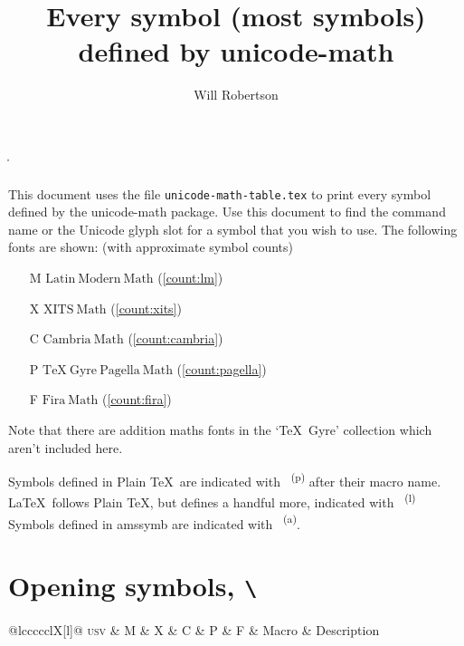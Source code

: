 \documentclass[final]{article}
\makeatletter
\def\cmd#1{\texttt{\textbackslash\expandafter\@gobble\string#1}}
\newcounter{#1}
\def\INPUT{}
\def\TABLE{%
  \par\noindent
  \begin{longtabu}[l]{@{}lccccclX[l]@{}}
    \toprule
    \textsc{usv} & M & X & C & P & F & Macro & Description \\
    \midrule \endhead
    \INPUT\\
    \bottomrule
  \end{longtabu}
}
\def\USV#1{\footnotesize\scshape\MakeLowercase{u+\@gobble#1}}
\def\CMD#1{\footnotesize\cmd#1}
\def\DESC#1{%
  \begin{spacing}{0.5}
    \RaggedRight\scriptsize #1%
  \end{spacing}
}
\newcommand\SHOW[1]{%
  \def\UnicodeMathSymbol##1##2##3##4{%
    \def\1{#1}\def\2{##3}%
    \ifx\1\2\PRINTLINE{##1}{##2}{##4}\fi
  }%
  \TABLE
}
\def\PRINTLINE#1#2#3{
    \def\tempa{
      \USV{#1} &
      \SYMB{#2}{lm}{#1} &
      \SYMB{#2}{xits}{#1} &
      \SYMB{#2}{cambria}{#1} &
      \SYMB{#2}{pagella}{#1} &
      \SYMB{#2}{fira}{#1} &
      \CMD{#2}
      \tl_if_in:NnT \PLAIN {#2}
        {
          \makebox[0pt][l]
            { \color[gray]{0.7} \textsuperscript{\sffamily (p)} }
        }
      \tl_if_in:NnT \LTXSYM {#2}
        {
          \makebox[0pt][l]
            { \color[gray]{0.7} \textsuperscript{\sffamily (l)} }
        }
      \tl_if_in:NnT \AMSSYMB {#2}
        {
          \makebox[0pt][l]
            { \color[gray]{0.7} \textsuperscript{\sffamily (a)} }
        }
      &
      \DESC{#3} \\
    }%
    \expandafter\tempa
}
\def\SYMB#1#2#3{%
  \expandafter\iffontchar\csname#2\endcsname #3\relax
    \refstepcounter{#2}%
    \mathversion{#2}%
    $\displaystyle#1$%
  \fi
}
\def\PLAIN{\alpha\beta\gamma\delta\epsilon\zeta\eta\theta\iota\kappa\lambda\mu\nu\xi\pi\rho\sigma\tau\upsilon\phi\chi\psi\omega\varepsilon\vartheta\varpi\varrho\varsigma\varphi\Gamma\Delta\Theta\Lambda\Xi\Pi\Sigma\Upsilon\Phi\Psi\Omega
%
\aleph\hbar\imath\jmath\ell\wp\Re\Im\partial\infty\prime\emptyset\nabla\surd\top\bot\angle\triangle\forall\exists\neg\flat\natural\sharp\clubsuit\diamondsuit\heartsuit\spadesuit
%
\coprod\bigvee\bigwedge\biguplus\bigcap\bigcup\int\prod\sum\bigotimes\bigoplus\bigodot\oint\bigsqcup\smallint
%
\triangleleft\triangleright\bigtriangleup\bigtriangledown\wedge\land\vee\lor\cap\cup\ddagger\dagger\sqcap\sqcup\uplus\amalg\diamond\bullet\wr\div\odot\oslash\otimes\ominus\oplus\mp\pm\circ\bigcirc\setminus\cdot\ast\times\star\propto\sqsubseteq\sqsupseteq\parallel\mid\dashv\vdash\nearrow\searrow\nwarrow\swarrow\Leftrightarrow\Leftarrow\Rightarrow\neq\ne\lnot\leq\le\geq\ge\succ\prec\approx\succeq\preceq\supset\subset\supseteq\subseteq\in\ni\owns\gg\ll\not\leftrightarrow\leftarrow\gets\rightarrow\to\mapstochar\mapsto\sim\simeq\perp\equiv\asymp\smile\frown\leftharpoonup\leftharpoondown\rightharpoonup\rightharpoondown
%
\joinrel\relbar\Relbar\lhook\hookrightarrow\rhook\hookleftarrow\bowtie\models\Longrightarrow\longrightarrow\longleftarrow\Longleftarrow\longmapsto\longleftrightarrow\Longleftrightarrow\iff
%
\ldotp\cdotp\colon\ldots\cdots\vdots\ddots
%
\acute\grave\ddot\tilde\bar\breve\check\hat\vec\dot\widetilde\widehat
%
\overrightarrow\overleftarrow\overbrace\underbrace\lmoustache\rmoustache\lgroup\rgroup\arrowvert\Arrowvert\bracevert\Vert\vert\uparrow\downarrow\updownarrow\Uparrow\Downarrow\Updownarrow\backslash\rangle\langle\rbrace\lbrace\rceil\lceil\rfloor\lfloor\sqrt}
\def\LTXSYM{
\cong
\notin
\rightleftharpoons
\doteq
\mathring
}
\def\AMSSYMB{\boxdot\boxplus\boxtimes\square\blacksquare\centerdot\lozenge\blacklozenge\circlearrowright\circlearrowleft\leftrightharpoons\boxminus\Vdash\Vvdash\vDash\twoheadrightarrow\twoheadleftarrow\leftleftarrows\rightrightarrows\upuparrows\downdownarrows\upharpoonright\restriction\downharpoonright\upharpoonleft\downharpoonleft\rightarrowtail\leftarrowtail\leftrightarrows\rightleftarrows\Lsh\Rsh\rightsquigarrow\leftrightsquigarrow\looparrowleft\looparrowright\circeq\succsim\gtrsim\gtrapprox\multimap\therefore\because\doteqdot\Doteq\triangleq\precsim\lesssim\lessapprox\eqslantless\eqslantgtr\curlyeqprec\curlyeqsucc\preccurlyeq\leqq\leqslant\lessgtr\backprime\risingdotseq\fallingdotseq\succcurlyeq\geqq\geqslant\gtrless\vartriangleright\vartriangleleft\trianglerighteq\trianglelefteq\bigstar\between\blacktriangledown\blacktriangleright\blacktriangleleft\vartriangle\blacktriangle\triangledown\eqcirc\lesseqgtr\gtreqless\lesseqqgtr\gtreqqless\Rrightarrow\Lleftarrow\veebar\barwedge\doublebarwedge\measuredangle\sphericalangle\varpropto\smallsmile\smallfrown\Subset\Supset\Cup\doublecup\Cap\doublecap\curlywedge\curlyvee\leftthreetimes\rightthreetimes\subseteqq\supseteqq\bumpeq\Bumpeq\lll\llless\ggg\gggtr\circledS\pitchfork\dotplus\backsim\backsimeq\complement\intercal\circledcirc\circledast\circleddash\lvertneqq\gvertneqq\nleq\ngeq\nless\ngtr\nprec\nsucc\lneqq\gneqq\nleqslant\ngeqslant\lneq\gneq\npreceq\nsucceq\precnsim\succnsim\lnsim\gnsim\nleqq\ngeqq\precneqq\succneqq\precnapprox\succnapprox\lnapprox\gnapprox\nsim\ncong\diagup\diagdown\varsubsetneq\varsupsetneq\nsubseteqq\nsupseteqq\subsetneqq\supsetneqq\varsubsetneqq\varsupsetneqq\subsetneq\supsetneq\nsubseteq\nsupseteq\nparallel\nmid\nshortmid\nshortparallel\nvdash\nVdash\nvDash\nVDash\ntrianglerighteq\ntrianglelefteq\ntriangleleft\ntriangleright\nleftarrow\nrightarrow\nLeftarrow\nRightarrow\nLeftrightarrow\nleftrightarrow\divideontimes\varnothing\nexists\Finv\Game\eth\eqsim\beth\gimel\daleth\lessdot\gtrdot\ltimes\rtimes\shortmid\shortparallel\smallsetminus\thicksim\thickapprox\approxeq\succapprox\precapprox\curvearrowleft\curvearrowright\digamma\varkappa\Bbbk\hslash\backepsilon}
\makeatother
\begin{document}
\MakeShortVerb\|
\title{Every symbol (most symbols) defined by \textsf{unicode-math}}
\author{Will Robertson}
\maketitle

This document uses the file \texttt{unicode-math-table.tex}
to print every symbol defined by the \textsf{unicode-math}
package.
Use this document to find the command name or the Unicode glyph slot for a symbol that you wish to use.
The following fonts are shown: (with approximate symbol counts)
\begin{itemize}
\item[M]  $\mathup{Latin\ Modern\ Math}$ (\ref{count:lm})
\item[X]  $\mathup{XITS\ Math}$ (\ref{count:xits})
\item[C]  $\mathup{Cambria\ Math}$ (\ref{count:cambria})
\item[P]  $\mathup{TeX\ Gyre\ Pagella\ Math}$ (\ref{count:pagella})
\item[F]  $\mathup{Fira\ Math}$ (\ref{count:fira})
\end{itemize}
Note that there are addition maths fonts in the `\TeX\ Gyre' collection which aren't included here.

Symbols defined in Plain \TeX\ are indicated with~{\color[gray]{0.6} \textsuperscript{\sffamily (p)}} after their macro name.
\LaTeX\ follows Plain \TeX, but defines a handful more, indicated with~{\color[gray]{0.6} \textsuperscript{\sffamily (l)}}
Symbols defined in \textsf{amssymb} are indicated with~{\color[gray]{0.6} \textsuperscript{\sffamily (a)}}.

\tableofcontents

\clearpage
\section{Opening symbols, \cmd\mathopen}
\begingroup
\def\sqrt{\sqrtsign{}}
\def\longdivision{\longdivisionsign{}}
\SHOW\mathopen
\endgroup
\end{document}
